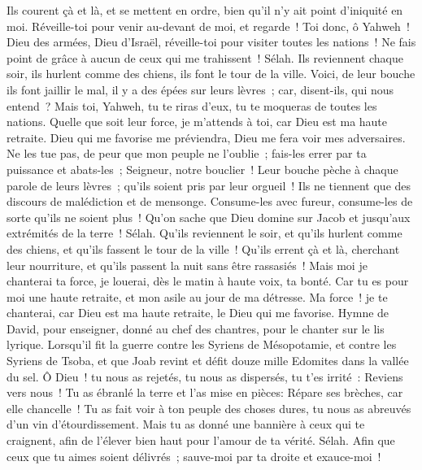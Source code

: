 \begin{multicols}{2}
Ils courent çà et là, et se mettent en ordre, bien qu'il n'y ait point d'iniquité en moi. Réveille-toi pour venir au-devant de moi, et regarde~!
Toi donc, ô Yahweh~! Dieu des armées, Dieu d'Israël, réveille-toi pour visiter toutes les nations~! Ne fais point de grâce à aucun de ceux qui me trahissent~! Sélah.
Ils reviennent chaque soir, ils hurlent comme des chiens, ils font le tour de la ville.
Voici, de leur bouche ils font jaillir le mal, il y a des épées sur leurs lèvres~; car, disent-ils, qui nous entend~?
Mais toi, Yahweh, tu te riras d'eux, tu te moqueras de toutes les nations.
Quelle que soit leur force, je m'attends à toi, car Dieu est ma haute retraite.
Dieu qui me favorise me préviendra, Dieu me fera voir mes adversaires.
Ne les tue pas, de peur que mon peuple ne l'oublie~; fais-les errer par ta puissance et abats-les~; Seigneur, notre bouclier~!
Leur bouche pèche à chaque parole de leurs lèvres~; qu'ils soient pris par leur orgueil~! Ils ne tiennent que des discours de malédiction et de mensonge.
Consume-les avec fureur, consume-les de sorte qu'ils ne soient plus~! Qu'on sache que Dieu domine sur Jacob et jusqu'aux extrémités de la terre~! Sélah.
Qu'ils reviennent le soir, et qu'ils hurlent comme des chiens, et qu'ils fassent le tour de la ville~!
Qu'ils errent çà et là, cherchant leur nourriture, et qu'ils passent la nuit sans être rassasiés~!
Mais moi je chanterai ta force, je louerai, dès le matin à haute voix, ta bonté. Car tu es pour moi une haute retraite, et mon asile au jour de ma détresse.
Ma force~! je te chanterai, car Dieu est ma haute retraite, le Dieu qui me favorise.
\VerseOne{}Hymne de David, pour enseigner, donné au chef des chantres, pour le chanter sur le lis lyrique.
Lorsqu'il fit la guerre contre les Syriens de Mésopotamie, et contre les Syriens de Tsoba, et que Joab revint et défit douze mille Edomites dans la vallée du sel.
Ô Dieu~! tu nous as rejetés, tu nous as dispersés, tu t'es irrité~: Reviens vers nous~!
Tu as ébranlé la terre et l'as mise en pièces: Répare ses brèches, car elle chancelle~!
Tu as fait voir à ton peuple des choses dures, tu nous as abreuvés d'un vin d'étourdissement.
Mais tu as donné une bannière à ceux qui te craignent, afin de l'élever bien haut pour l'amour de ta vérité. Sélah.
Afin que ceux que tu aimes soient délivrés~; sauve-moi par ta droite et exauce-moi~!

\end{multicols}
